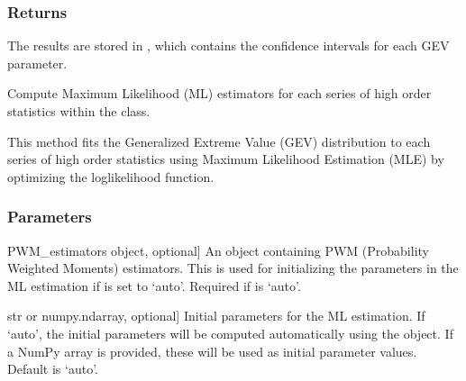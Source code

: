 \documentclass[a4paper,11pt,openany,english]{sphinxmanual}
\begin{document}
\begin{fulllineitems}
\begin{fulllineitems}
\subsubsection{Returns}
\label{\detokenize{api_topt:id54}}\begin{description}
\sphinxAtStartPar
The results are stored in , which contains the confidence intervals for each GEV parameter.

\end{description}

\end{fulllineitems}


\begin{fulllineitems}
\label{\detokenize{api_topt:xtremes.topt.ML_estimators.get_ML_estimation}}
\pysigstartsignatures
{}
\pysigstopsignatures
\sphinxAtStartPar
Compute Maximum Likelihood (ML) estimators for each series of high order statistics within the  class.

\sphinxAtStartPar
This method fits the Generalized Extreme Value (GEV) distribution to each series of high order statistics
using Maximum Likelihood Estimation (MLE) by optimizing the log\sphinxhyphen{}likelihood function.


\subsubsection{Parameters}
\label{\detokenize{api_topt:id55}}\begin{description}
\sphinxlineitem{PWM\_estimators}{[}PWM\_estimators object, optional{]}
\sphinxAtStartPar
An object containing PWM (Probability Weighted Moments) estimators. This is used for initializing the 
parameters in the ML estimation if  is set to ‘auto’. Required if  is ‘auto’.

\sphinxlineitem{initParams}{[}str or numpy.ndarray, optional{]}
\sphinxAtStartPar
Initial parameters for the ML estimation. If ‘auto’, the initial parameters will be computed automatically 
using the  object. If a NumPy array is provided, these will be used as initial parameter values.
Default is ‘auto’.


\end{description}
\end{fulllineitems}
\end{fulllineitems}
\end{document}
